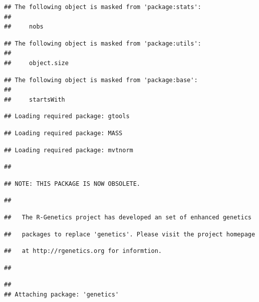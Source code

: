 \documentclass[
]{article}
\begin{document}
\begin{verbatim}
## The following object is masked from 'package:stats':
## 
##     nobs
\end{verbatim}

\begin{verbatim}
## The following object is masked from 'package:utils':
## 
##     object.size
\end{verbatim}

\begin{verbatim}
## The following object is masked from 'package:base':
## 
##     startsWith
\end{verbatim}

\begin{verbatim}
## Loading required package: gtools
\end{verbatim}

\begin{verbatim}
## Loading required package: MASS
\end{verbatim}

\begin{verbatim}
## Loading required package: mvtnorm
\end{verbatim}

\begin{verbatim}
## 
\end{verbatim}

\begin{verbatim}
## NOTE: THIS PACKAGE IS NOW OBSOLETE.
\end{verbatim}

\begin{verbatim}
## 
\end{verbatim}

\begin{verbatim}
##   The R-Genetics project has developed an set of enhanced genetics
\end{verbatim}

\begin{verbatim}
##   packages to replace 'genetics'. Please visit the project homepage
\end{verbatim}

\begin{verbatim}
##   at http://rgenetics.org for informtion.
\end{verbatim}

\begin{verbatim}
## 
\end{verbatim}

\begin{verbatim}
## 
## Attaching package: 'genetics'
\end{verbatim}
\end{document}
